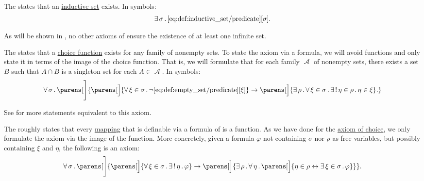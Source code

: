 \begin{definition}
\begin{thmenum}
     The  states that an \hyperref[def:inductive_set]{inductive set} exists. In symbols:
    \begin{equation}\label{eq:def:zfc/infinity}
      \exists \thinspace \sigma \thinspace . \thinspace \ref{eq:def:inductive_set/predicate}[\sigma].
    \end{equation}

    As will be shown in , no other axioms of  ensure the existence of at least one infinite set.

     The  states that a \hyperref[def:choice_function]{choice function} exists for any family of nonempty sets. To state the axiom via a formula, we will avoid functions and only state it in terms of the image of the choice function. That is, we will formulate that for each family \( \mscrA \) of nonempty sets, there exists a set \( B \) such that \( A \cap B \) is a singleton set for each \( A \in \mscrA \). In symbols:
    \begin{equation}\label{eq:def:zfc/choice}
      \qforall \sigma \parens[\Bigg]
        {
          \parens[\Big]{ \qforall {\xi \in \sigma} \neg \ref{eq:def:empty_set/predicate}[\xi] }
          \rightarrow
          \parens[\Big]{ \qexists \rho \qforall {\xi \in \sigma} \qExists {\eta \in \rho} \eta \in \xi }.
        }
    \end{equation}

    See  for more statements equivalent to this axiom.

     The  roughly states that every \hyperref[rem:function_definition]{mapping} that is definable via a formula of  is a function. As we have done for the \hyperref[def:zfc/choice]{axiom of choice}, we only formulate the axiom via the image of the function. More concretely, given a formula \( \varphi \) not containing \( \sigma \) nor \( \rho \) as free variables, but possibly containing \( \xi \) and \( \eta \), the following is an axiom:
    \begin{equation}\label{eq:def:zfc/replacement}
      \qforall \sigma \parens[\Bigg]
        {
          \parens[\Big]{ \qforall {\xi \in \sigma} \qExists \eta \varphi }
          \rightarrow
          \parens[\Big]{ \qexists \rho \qforall \eta \parens[\Big]{ \eta \in \rho \leftrightarrow \qexists {\xi \in \sigma} \varphi } }
        }.
    \end{equation}


\end{thmenum}
\end{definition}
